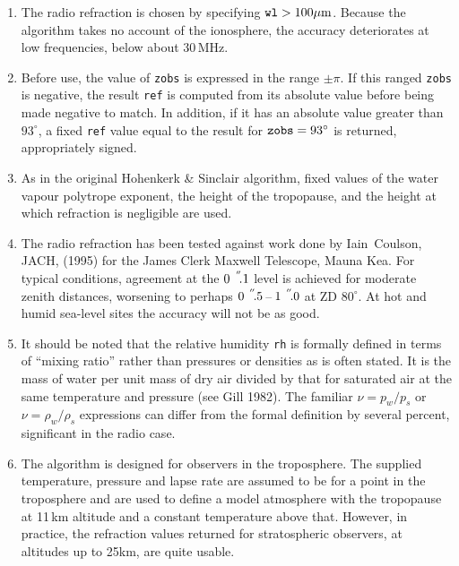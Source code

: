 \documentclass[11pt,fleqn,twoside]{article}
\renewcommand{\_}{{\tt\char'137}}     %
\newcommand{\arcseci}[1] {$#1\hspace{0.05em}$\raisebox{-0.5ex}
                         {$^{'\hspace{-0.1em}'\hspace{0.0em}}$}}
\newcommand{\arcsec}[2] {\arcseci{#1}$\hspace{-0.35em}.#2$}
\begin{document}
{\begin{enumerate}
\begin{itemize}
       \end{itemize}
 \item The radio refraction is chosen by specifying
       ${\tt wl}>100\mu{\rm m}$.
       Because the algorithm takes no account of the ionosphere, the
       accuracy deteriorates at low frequencies, below about 30\,MHz.
 \item Before use, the value of
       {\tt zobs} is expressed in the range $\pm\pi$.
       If this ranged {\tt zobs} is negative, the result
       {\tt ref} is computed from its
       absolute value before being made negative to match.  In addition, if
       it has an absolute value greater than $93^\circ$,
       a fixed {\tt ref} value
       equal to the result for ${\tt zobs}=93^\circ$ is returned,
       appropriately signed.
 \item As in the original Hohenkerk \& Sinclair algorithm, fixed values
       of the water vapour polytrope exponent, the height of the
       tropopause, and the height at which refraction is negligible are
       used.
 \item The radio refraction has been tested against work done by
       Iain~Coulson, JACH, (1995) for the
       James Clerk Maxwell Telescope, Mauna Kea.  For typical conditions,
       agreement at the \arcsec{0}{1} level is achieved for moderate
       zenith distances, worsening to perhaps
       \arcsec{0}{5}\,--\,\arcsec{1}{0} at ZD $80^\circ$.
       At hot and humid sea-level sites the accuracy will not be as good.
 \item It should be noted that the relative humidity
       {\tt rh} is formally
       defined in terms of ``mixing ratio'' rather than pressures or
       densities as is often stated.  It is the mass of water per unit
       mass of dry air divided by that for saturated air at the same
       temperature and pressure (see Gill 1982).  The familiar
       $\nu=p_w/p_s$ or $\nu=\rho_w/\rho_s$ expressions can differ from
       the formal definition by several percent, significant in the
       radio case.
 \item The algorithm is designed for observers in the troposphere.  The
       supplied temperature, pressure and lapse rate are assumed to be
       for a point in the troposphere and are used to define a model
       atmosphere with the tropopause at 11\,km altitude and a constant
       temperature above that.  However, in practice, the refraction
       values returned for stratospheric observers, at altitudes up to
       25km, are quite usable.
  \end{enumerate}
}
\end{document}
